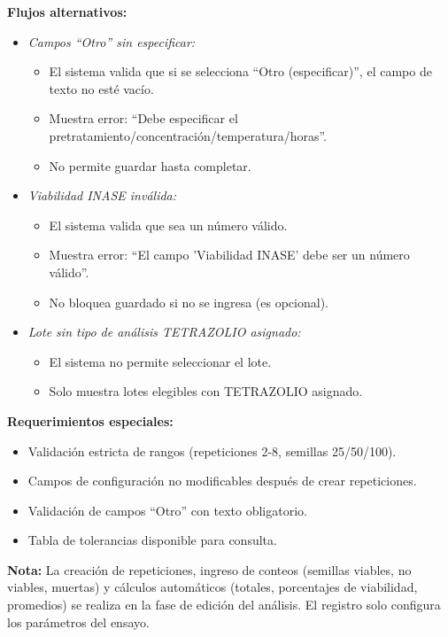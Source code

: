 \vspace{0.5em}
\noindent\textbf{Flujos alternativos:}
\begin{itemize}[nosep]
    \item \textit{Campos ``Otro'' sin especificar:}
    \begin{itemize}[nosep]
        \item El sistema valida que si se selecciona ``Otro (especificar)'', el campo de texto no esté vacío.
        \item Muestra error: ``Debe especificar el pretratamiento/concentración/temperatura/horas''.
        \item No permite guardar hasta completar.
    \end{itemize}
    \item \textit{Viabilidad INASE inválida:}
    \begin{itemize}[nosep]
        \item El sistema valida que sea un número válido.
        \item Muestra error: ``El campo 'Viabilidad INASE' debe ser un número válido''.
        \item No bloquea guardado si no se ingresa (es opcional).
    \end{itemize}
    \item \textit{Lote sin tipo de análisis TETRAZOLIO asignado:}
    \begin{itemize}[nosep]
        \item El sistema no permite seleccionar el lote.
        \item Solo muestra lotes elegibles con TETRAZOLIO asignado.
    \end{itemize}
\end{itemize}

\vspace{0.5em}
\noindent\textbf{Requerimientos especiales:}
\begin{itemize}[nosep]
    \item Validación estricta de rangos (repeticiones 2-8, semillas 25/50/100).
    \item Campos de configuración no modificables después de crear repeticiones.
    \item Validación de campos ``Otro'' con texto obligatorio.
    \item Tabla de tolerancias disponible para consulta.
\end{itemize}

\vspace{0.5em}
\noindent\textbf{Nota:} La creación de repeticiones, ingreso de conteos (semillas viables, no viables, muertas) y cálculos automáticos (totales, porcentajes de viabilidad, promedios) se realiza en la fase de edición del análisis. El registro solo configura los parámetros del ensayo.
